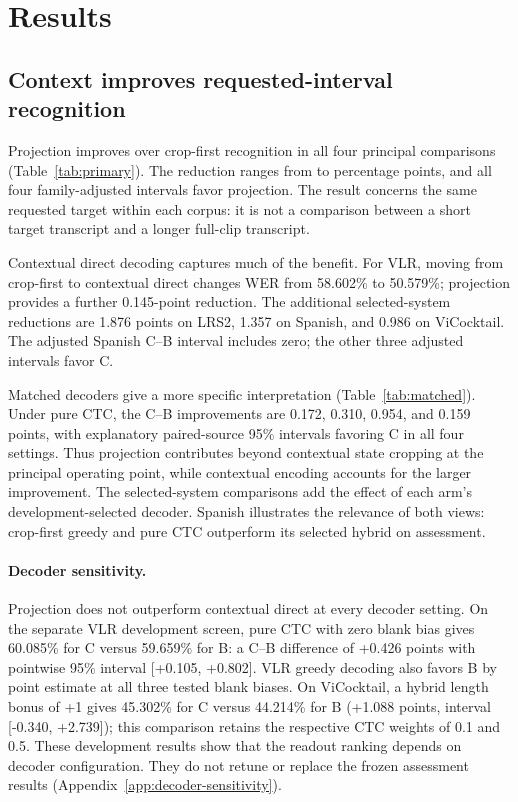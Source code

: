 \section{Results}

\subsection{Context improves requested-interval recognition}


Projection improves over crop-first recognition in all four principal
comparisons (Table~\ref{tab:primary}). The reduction ranges from
\PrimaryGainMin{} to \PrimaryGainMax{} percentage points, and all four
family-adjusted intervals favor projection. The result concerns the same
requested target within each corpus: it is not a comparison between a short
target transcript and a longer full-clip transcript.

Contextual direct decoding captures much of the benefit. For VLR, moving from
crop-first to contextual direct changes WER from 58.602\% to 50.579\%;
projection provides a further 0.145-point reduction. The additional
selected-system reductions are 1.876 points on LRS2, 1.357 on Spanish, and
0.986 on ViCocktail. The adjusted Spanish C--B interval includes zero;
the other three adjusted intervals favor C.

Matched decoders give a more specific interpretation
(Table~\ref{tab:matched}). Under pure CTC, the C--B improvements are
0.172, 0.310, 0.954, and 0.159 points, with explanatory paired-source 95\%
intervals favoring C in all four settings. Thus projection contributes beyond
contextual state cropping at the principal operating point, while contextual
encoding accounts for the larger improvement. The selected-system comparisons
add the effect of each arm's development-selected decoder. Spanish illustrates
the relevance of both views: crop-first greedy and pure CTC outperform its
selected hybrid on assessment.

\paragraph{Decoder sensitivity.}
Projection does not outperform contextual direct at every decoder setting.
On the separate VLR development screen, pure CTC with zero blank bias gives
60.085\% for C versus 59.659\% for B: a C--B difference of +0.426 points
with pointwise 95\% interval [+0.105, +0.802]. VLR greedy decoding also
favors B by point estimate at all three tested blank biases.
On ViCocktail, a hybrid length bonus of +1 gives 45.302\% for C versus
44.214\% for B (+1.088 points, interval [-0.340, +2.739]); this comparison
retains the respective CTC weights of 0.1 and 0.5. These development results
show that the readout ranking depends on decoder configuration. They do not
retune or replace the frozen assessment results (Appendix~\ref{app:decoder-sensitivity}).

